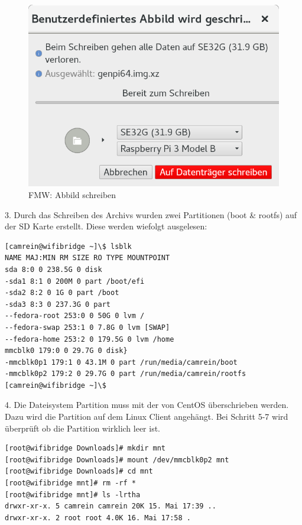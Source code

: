 \begin{figure}[H]
	\centering
	\includegraphics[scale=0.3]{Bilder/fmw3.png}
	\caption{FMW: Abbild schreiben}
\end{figure}
3. Durch das Schreiben des Archivs wurden zwei Partitionen (boot \& rootfs) auf der SD Karte erstellt. Diese werden wiefolgt ausgelesen:
\begin{lstlisting}
[camrein@wifibridge ~]\$ lsblk
NAME MAJ:MIN RM SIZE RO TYPE MOUNTPOINT
sda 8:0 0 238.5G 0 disk 
-sda1 8:1 0 200M 0 part /boot/efi
-sda2 8:2 0 1G 0 part /boot
-sda3 8:3 0 237.3G 0 part 
--fedora-root 253:0 0 50G 0 lvm /
--fedora-swap 253:1 0 7.8G 0 lvm [SWAP]
--fedora-home 253:2 0 179.5G 0 lvm /home
mmcblk0 179:0 0 29.7G 0 disk}
-mmcblk0p1 179:1 0 43.1M 0 part /run/media/camrein/boot
-mmcblk0p2 179:2 0 29.7G 0 part /run/media/camrein/rootfs
[camrein@wifibridge ~]\$
\end{lstlisting}
4. Die Dateisystem Partition muss mit der von CentOS überschrieben werden. Dazu wird die Partition auf dem Linux Client angehängt. Bei Schritt 5-7 wird überprüft ob die Partition wirklich leer ist.
\begin{lstlisting}
[root@wifibridge Downloads]# mkdir mnt
[root@wifibridge Downloads]# mount /dev/mmcblk0p2 mnt
[root@wifibridge Downloads]# cd mnt
[root@wifibridge mnt]# rm -rf *
[root@wifibridge mnt]# ls -lrtha
drwxr-xr-x. 5 camrein camrein 20K 15. Mai 17:39 ..
drwxr-xr-x. 2 root root 4.0K 16. Mai 17:58 .
\end{lstlisting}


